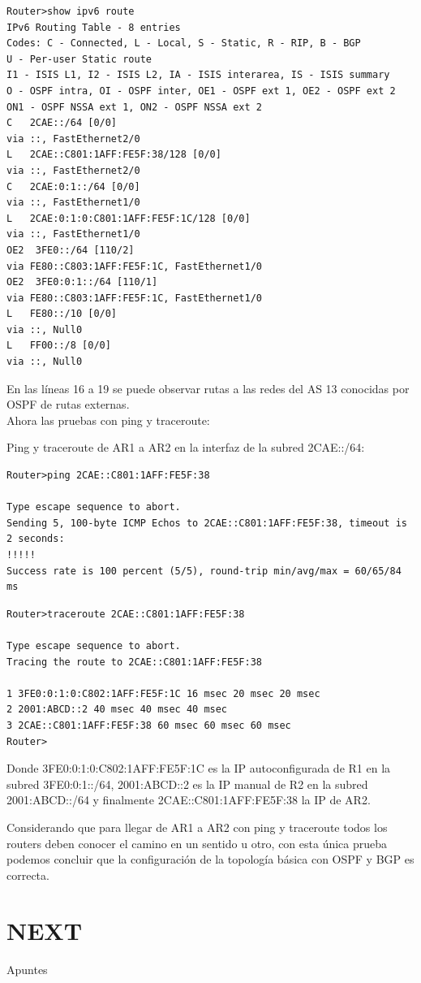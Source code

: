 \documentclass{article}
\begin{document}
\begin{lstlisting}
Router>show ipv6 route
IPv6 Routing Table - 8 entries
Codes: C - Connected, L - Local, S - Static, R - RIP, B - BGP
U - Per-user Static route
I1 - ISIS L1, I2 - ISIS L2, IA - ISIS interarea, IS - ISIS summary
O - OSPF intra, OI - OSPF inter, OE1 - OSPF ext 1, OE2 - OSPF ext 2
ON1 - OSPF NSSA ext 1, ON2 - OSPF NSSA ext 2
C   2CAE::/64 [0/0]
via ::, FastEthernet2/0
L   2CAE::C801:1AFF:FE5F:38/128 [0/0]
via ::, FastEthernet2/0
C   2CAE:0:1::/64 [0/0]
via ::, FastEthernet1/0
L   2CAE:0:1:0:C801:1AFF:FE5F:1C/128 [0/0]
via ::, FastEthernet1/0
OE2  3FE0::/64 [110/2]
via FE80::C803:1AFF:FE5F:1C, FastEthernet1/0
OE2  3FE0:0:1::/64 [110/1]
via FE80::C803:1AFF:FE5F:1C, FastEthernet1/0
L   FE80::/10 [0/0]
via ::, Null0
L   FF00::/8 [0/0]
via ::, Null0
\end{lstlisting}                                                                                

En las líneas 16 a 19 se puede observar rutas a las redes del AS 13 conocidas por OSPF de rutas externas.
\\

Ahora las pruebas con ping y traceroute:

Ping y traceroute de AR1 a AR2 en la interfaz de la subred 2CAE::/64:
\begin{lstlisting}
Router>ping 2CAE::C801:1AFF:FE5F:38

Type escape sequence to abort.
Sending 5, 100-byte ICMP Echos to 2CAE::C801:1AFF:FE5F:38, timeout is 2 seconds:
!!!!!
Success rate is 100 percent (5/5), round-trip min/avg/max = 60/65/84 ms
\end{lstlisting}
\begin{lstlisting}
Router>traceroute 2CAE::C801:1AFF:FE5F:38

Type escape sequence to abort.
Tracing the route to 2CAE::C801:1AFF:FE5F:38

1 3FE0:0:1:0:C802:1AFF:FE5F:1C 16 msec 20 msec 20 msec
2 2001:ABCD::2 40 msec 40 msec 40 msec
3 2CAE::C801:1AFF:FE5F:38 60 msec 60 msec 60 msec
Router>
\end{lstlisting}
                                                       
Donde 3FE0:0:1:0:C802:1AFF:FE5F:1C es la IP autoconfigurada de R1 en la subred 3FE0:0:1::/64, 2001:ABCD::2 es la IP manual de R2 en la subred 2001:ABCD::/64 y finalmente 2CAE::C801:1AFF:FE5F:38 la IP de AR2.

Considerando que para llegar de AR1 a AR2 con ping y traceroute todos los routers deben conocer el camino en un sentido u otro, con esta única prueba podemos concluir que la configuración de la topología básica con OSPF y BGP es correcta.


\section{NEXT}



\begin{thebibliography}{99}
	Apuntes
\end{thebibliography}
\end{document}
